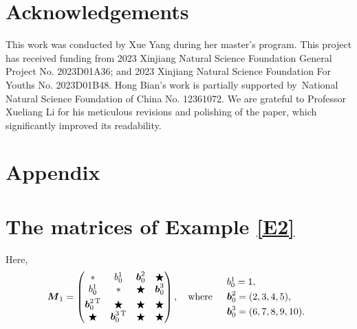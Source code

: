 \documentclass[12pt]{article}
\begin{document}
\section{Acknowledgements}
This work was conducted by Xue Yang during her master's program. This project has received funding from 2023 Xinjiang Natural Science Foundation General Project No. 2023D01A36; and 2023 Xinjiang Natural Science Foundation For Youths No. 2023D01B48. Hong Bian's work is partially supported by National Natural Science Foundation of China No. 12361072. We are grateful to Professor Xueliang Li for his meticulous revisions and polishing of the paper, which significantly improved its readability.


\section*{Appendix}
\appendix
\section{The matrices of Example \ref{E2}}\label{A}
Here, 
\begin{equation*}
	\boldsymbol{M}_{1}=\begin{pmatrix}
		* &b_{0}^{1} &\boldsymbol{b}_{0}^{2} & \bigstar\\
		b_{0}^{1} & * & \bigstar &\boldsymbol{b}_{0}^{3}\\[3pt]
		\boldsymbol{b}_{0}^{2\,{\rm T}} & \bigstar & \bigstar & \bigstar\\
		\bigstar & \boldsymbol{b}_{0}^{3\,{\rm T}} & \bigstar & \bigstar	
	\end{pmatrix},
	\quad {\rm where}\quad
	\begin{array}{l}
		{b}_{0}^{1}=1,\\[3pt]
		\boldsymbol{b}_{0}^{2}=(2,3,4,5),\\[3pt]
		\boldsymbol{b}_{0}^{3}=(6,7,8,9,10).
	\end{array}
\end{equation*}
\end{document}
